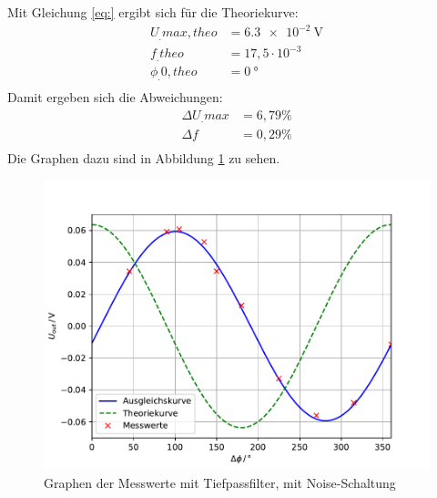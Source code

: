 Mit Gleichung \eqref{eq:} ergibt sich für die Theoriekurve:
\begin{align*}
U_.{max,theo} &= \SI{6,3e-2}{\volt} \\
f_.{theo}	  &= 17,5\cdot 10^{-3} \\
\phi_.{0,theo}&= \SI{0}{\degree} \\
\end{align*}
Damit ergeben sich die Abweichungen:
\begin{align*}
\Delta U_.{max} &= 6,79\% \\
\Delta f		&= 0,29\% \\
\end{align*}
Die Graphen dazu sind in Abbildung \ref{fig:U4} zu sehen.
\begin{figure}
\centering
\includegraphics[scale=0.5]{content/images/plot2.pdf}
\caption{Graphen der Messwerte mit Tiefpassfilter, mit Noise-Schaltung}\label{fig:U4}
\end{figure}
